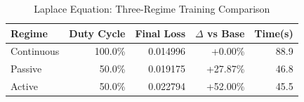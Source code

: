 \begin{table}[htbp]
\centering
\caption{Laplace Equation: Three-Regime Training Comparison}
\label{tab:laplace_regimes}
\begin{tabular}{lrrrr}
\hline
Regime & Duty Cycle & Final Loss & $\Delta$ vs Base & Time(s) \\
\hline
Continuous & 100.0\% & 0.014996 & +0.00\% & 88.9 \\
Passive & 50.0\% & 0.019175 & +27.87\% & 46.8 \\
Active & 50.0\% & 0.022794 & +52.00\% & 45.5 \\
\hline
\end{tabular}
\end{table}

